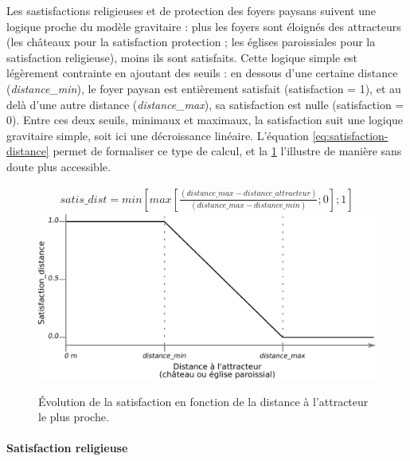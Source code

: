 Les sastisfactions religieuses et de protection des foyers paysans suivent une logique proche du modèle gravitaire : plus les foyers sont éloignés des \og attracteurs\fg{} (les châteaux pour la satisfaction protection ; les églises paroissiales pour la satisfaction religieuse), moins ils sont satisfaits.
Cette logique simple est légèrement contrainte en ajoutant des seuils : en dessous d'une certaine distance (\textit{distance\_min}), le foyer paysan est entièrement satisfait (satisfaction = 1), et au delà d'une autre distance (\textit{distance\_max}), sa satisfaction est nulle (satisfaction = 0).
Entre ces deux seuils, minimaux et maximaux, la satisfaction suit une logique gravitaire simple, soit ici une décroissance linéaire.
L'équation \ref{eq:satisfaction-distance} permet de formaliser ce type de calcul, et la \cref{fig:satisfaction-distance} l'illustre de manière sans doute plus accessible.

\begin{figure}[H]
	\centering
	\begin{equation}\label{eq:satisfaction-distance}
	\begin{gathered}
	satis\_dist = min  \left \lbrack max \left \lbrack \frac{(distance\_max - distance\_attracteur)}{(distance\_max -distance\_min)}; 0 \right \rbrack ; 1 \right \rbrack
	\end{gathered}
	\end{equation}
	\includegraphics[width=.8\linewidth]{img/satisfaction_distance.pdf}
	\caption{Évolution de la satisfaction en fonction de la distance à l'attracteur le plus proche.}
	\label{fig:satisfaction-distance}
\end{figure}

\paragraph{Satisfaction religieuse}
		
